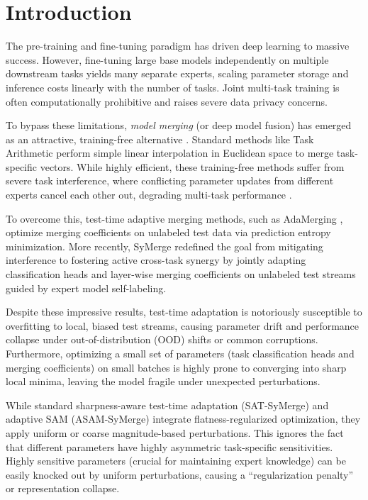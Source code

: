 \documentclass{article}
\theoremstyle{plain}
\theoremstyle{definition}
\theoremstyle{remark}
\begin{document}
\section{Introduction}
\label{sec:intro}
The pre-training and fine-tuning paradigm has driven deep learning to massive success. However, fine-tuning large base models independently on multiple downstream tasks yields many separate experts, scaling parameter storage and inference costs linearly with the number of tasks. Joint multi-task training is often computationally prohibitive and raises severe data privacy concerns. 

To bypass these limitations, \textit{model merging} (or deep model fusion) has emerged as an attractive, training-free alternative \cite{wortsman2022model, ilharco2022editing}. Standard methods like Task Arithmetic perform simple linear interpolation in Euclidean space to merge task-specific vectors. While highly efficient, these training-free methods suffer from severe task interference, where conflicting parameter updates from different experts cancel each other out, degrading multi-task performance \cite{yadav2023ties}.

To overcome this, test-time adaptive merging methods, such as AdaMerging \cite{yang2024adamerging}, optimize merging coefficients on unlabeled test data via prediction entropy minimization. More recently, SyMerge \cite{jung2025symerge} redefined the goal from mitigating interference to fostering active cross-task synergy by jointly adapting classification heads and layer-wise merging coefficients on unlabeled test streams guided by expert model self-labeling. 

Despite these impressive results, test-time adaptation is notoriously susceptible to overfitting to local, biased test streams, causing parameter drift and performance collapse under out-of-distribution (OOD) shifts or common corruptions. Furthermore, optimizing a small set of parameters (task classification heads and merging coefficients) on small batches is highly prone to converging into sharp local minima, leaving the model fragile under unexpected perturbations.

While standard sharpness-aware test-time adaptation (SAT-SyMerge) \cite{submission1} and adaptive SAM (ASAM-SyMerge) integrate flatness-regularized optimization, they apply uniform or coarse magnitude-based perturbations. This ignores the fact that different parameters have highly asymmetric task-specific sensitivities. Highly sensitive parameters (crucial for maintaining expert knowledge) can be easily knocked out by uniform perturbations, causing a ``regularization penalty'' or representation collapse.
\end{document}
